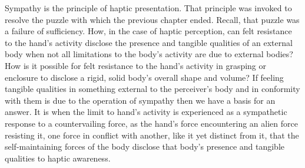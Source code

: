 Sympathy is the principle of haptic presentation. That principle was invoked to resolve the puzzle with which the previous chapter ended. Recall, that puzzle was a failure of sufficiency. How, in the case of haptic perception, can felt resistance to the hand's activity disclose the presence and tangible qualities of an external body when not all limitations to the body's activity are due to external bodies? How is it possible for felt resistance to the hand’s activity in grasping or enclosure to disclose a rigid, solid body’s overall shape and volume? If feeling tangible qualities in something external to the perceiver’s body and in conformity with them is due to the operation of sympathy then we have a basis for an answer. It is when the limit to hand’s activity is experienced as a sympathetic response to a countervailing force, as the hand’s force encountering an alien force resisting it, one force in conflict with another, like it yet distinct from it, that the self-maintaining forces of the body disclose that body’s presence and tangible qualities to haptic awareness.

